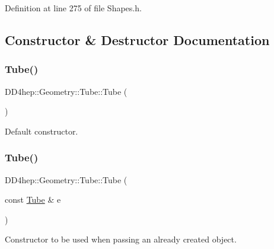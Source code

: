 Definition at line 275 of file Shapes.\+h.



\subsection{Constructor \& Destructor Documentation}
\hypertarget{class_d_d4hep_1_1_geometry_1_1_tube_af8531ba0aad4d787a21025d22b89f93e}{}\label{class_d_d4hep_1_1_geometry_1_1_tube_af8531ba0aad4d787a21025d22b89f93e} 
\subsubsection{\texorpdfstring{Tube()}{Tube()}\hspace{0.1cm}{\footnotesize\ttfamily [1/10]}}
{\footnotesize\ttfamily D\+D4hep\+::\+Geometry\+::\+Tube\+::\+Tube (\begin{DoxyParamCaption}{ }\end{DoxyParamCaption})\hspace{0.3cm}{\ttfamily [default]}}



Default constructor. 

\hypertarget{class_d_d4hep_1_1_geometry_1_1_tube_a1aedf7737593e86112e0f14704a428a1}{}\label{class_d_d4hep_1_1_geometry_1_1_tube_a1aedf7737593e86112e0f14704a428a1} 
\subsubsection{\texorpdfstring{Tube()}{Tube()}\hspace{0.1cm}{\footnotesize\ttfamily [2/10]}}
{\footnotesize\ttfamily D\+D4hep\+::\+Geometry\+::\+Tube\+::\+Tube (\begin{DoxyParamCaption}\item[{const \hyperlink{class_d_d4hep_1_1_geometry_1_1_tube}{Tube} \&}]{e }\end{DoxyParamCaption})\hspace{0.3cm}{\ttfamily [default]}}



Constructor to be used when passing an already created object. 

